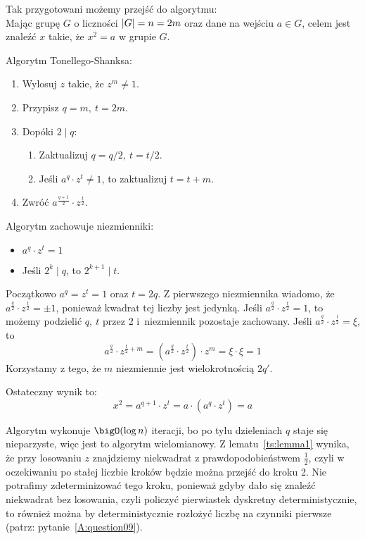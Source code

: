 \newpage
Tak przygotowani możemy przejść do algorytmu: \\
Mając grupę \( G \) o liczności \( \left\lvert G\right\rvert = n = 2m \) oraz dane na wejściu \( a \in G \), celem jest znaleźć \( x \) takie, że \( x^2 = a \) w grupie \( G \).
\begin{greyframe}
    Algorytm Tonellego-Shanksa:
    \begin{enumerate}
        \item Wylosuj \( z \) takie, że \( z^m \neq 1 \).
        \item Przypisz \( q = m, \ t = 2m \).
        \item Dopóki \( 2 \mid q \):
        \begin{enumerate}
            \item Zaktualizuj \( q = q / 2, \ t = t / 2 \).
            \item Jeśli \( a^q \cdot z^t \neq 1 \), to zaktualizuj \( t = t + m \).
        \end{enumerate}
        \item Zwróć \( a^{\frac{q+1}{2}} \cdot z^{\frac{t}{2}} \).
    \end{enumerate}
\end{greyframe}
Algorytm zachowuje niezmienniki:
\begin{itemize}
    \item \( a^q \cdot z^t = 1 \)
    \item Jeśli \( 2^k \mid q \), to \( 2^{k+1} \mid t \).
\end{itemize}
Początkowo \(a^q = z^t = 1 \) oraz \( t = 2q \).
Z pierwszego niezmiennika wiadomo, że \( a^{\frac{q}{2}} \cdot z^{\frac{t}{2}} = \pm 1 \), ponieważ kwadrat tej liczby jest jedynką.
Jeśli \( a^{\frac{q}{2}} \cdot z^{\frac{t}{2}} = 1 \), to możemy podzielić \( q, \ t \) przez 2 i~niezmiennik pozostaje zachowany.
Jeśli \( a^{\frac{q}{2}} \cdot z^{\frac{t}{2}} = \xi \), to
\[
    a^{\frac{q}{2}} \cdot z^{\frac{t}{2} + m} = (a^{\frac{q}{2}} \cdot z^{\frac{t}{2}}) \cdot z^m = \xi \cdot \xi = 1
\]
Korzystamy z tego, że \( m \) niezmiennie jest wielokrotnością \( 2q' \).

Ostateczny wynik to:
\[
    x^2 = a^{q+1} \cdot z^t = a \cdot (a^q \cdot z^t) = a
\]

Algorytm wykonuje \( \bigO(\log n) \) iteracji, bo po tylu dzieleniach \( q \) staje się nieparzyste, więc jest to algorytm wielomianowy.
Z lematu~\ref{ts:lemma1} wynika, że przy losowaniu \( z \) znajdziemy niekwadrat z prawdopodobieństwem \( \frac{1}{2} \), czyli w oczekiwaniu po stałej liczbie kroków będzie można przejść do kroku 2.
Nie potrafimy zdeterminizować tego kroku, ponieważ gdyby dało się znaleźć niekwadrat bez losowania, czyli policzyć pierwiastek dyskretny deterministycznie, to również można by deterministycznie rozłożyć liczbę na czynniki pierwsze (patrz: pytanie~\ref{A:question09}).